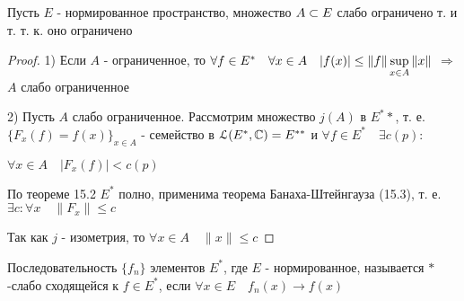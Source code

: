 \documentclass[a4paper,12pt]{report}
\newcommand*{\hm}[1]{#1\nobreak\discretionary{}%
            {\hbox{$\mathsurround=0pt #1$}}{}}
\begin{document}
\begin{thm}
Пусть $E$ - нормированное пространство, множество $A\hm\subset E$ слабо ограничено т. и т. т. к. оно ограничено
\end{thm}
\begin{proof}
1) Если $A$  - ограниченное, то $\forall f\in E^*\quad\forall x\in A\quad|f(x)|\hm\le\|f\|\sup\limits_{x\in A}\|x\|$ $\Rightarrow$ $A$ слабо ограниченное

2) Пусть $A$ слабо ограниченное. Рассмотрим множество $j(A)$ в $E^**$, т. е. $\{F_x(f)=f(x)\}_{x\in A}$ - семейство в $\EuScript L(E^*,\mathbb C)=E^{**}$ и $\forall f\in E^*\quad\exists c(p)\colon$

$\forall x\in A\quad|F_x(f)|<c(p)$

По теореме 15.2 $E^*$ полно, применима теорема Банаха-Штейнгауза (15.3), т. е. $\exists c\colon\forall x\quad\|F_x\|\le c$

Так как $j$ - изометрия, то $\forall x\in A\quad\|x\|\le c$
\end{proof}
 


\begin{df}
Последовательность $\{f_n\}$ элементов $E^*$, где $E$ - нормированное, называется $*$-слабо сходящейся к $f\in E^*$, если $\forall x\in E\quad f_n(x)\to f(x)$
\end{df}
 
\end{document}

